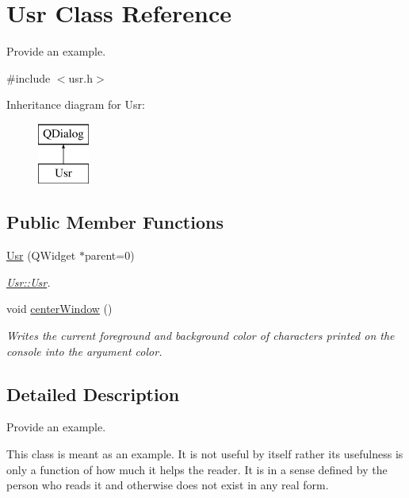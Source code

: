 \hypertarget{class_usr}{\section{Usr Class Reference}
\label{class_usr}
}


Provide an example.  




{\ttfamily \#include $<$usr.\+h$>$}

Inheritance diagram for Usr\+:\begin{figure}[H]
\begin{center}
\leavevmode
\includegraphics[height=2.000000cm]{class_usr}
\end{center}
\end{figure}
\subsection*{Public Member Functions}
\begin{DoxyCompactItemize}
\item 
\hyperlink{class_usr_a6bf567c68300ddd9a1825799b4a9803b}{Usr} (Q\+Widget $\ast$parent=0)
\begin{DoxyCompactList}\small\item\em \hyperlink{class_usr_a6bf567c68300ddd9a1825799b4a9803b}{Usr\+::\+Usr}. \end{DoxyCompactList}\item 
void \hyperlink{class_usr_a23ed125e9d15a4a2673a10280c106c74}{center\+Window} ()
\begin{DoxyCompactList}\small\item\em Writes the current foreground and background color of characters printed on the console into the argument color. \end{DoxyCompactList}\end{DoxyCompactItemize}


\subsection{Detailed Description}
Provide an example. 

This class is meant as an example. It is not useful by itself rather its usefulness is only a function of how much it helps the reader. It is in a sense defined by the person who reads it and otherwise does not exist in any real form.


